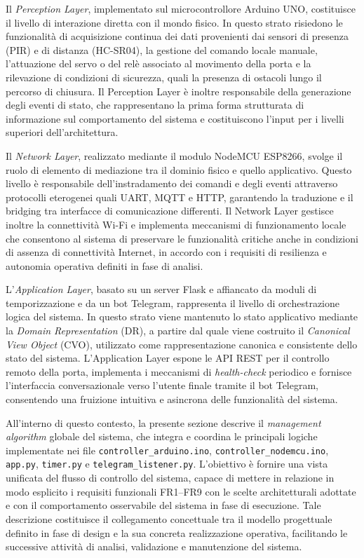 Il \textit{Perception Layer}, implementato sul microcontrollore Arduino UNO,
costituisce il livello di interazione diretta con il mondo fisico. In questo
strato risiedono le funzionalità di acquisizione continua dei dati provenienti
dai sensori di presenza (PIR) e di distanza (HC-SR04), la gestione del comando
locale manuale, l’attuazione del servo o del relè associato al movimento della
porta e la rilevazione di condizioni di sicurezza, quali la presenza di
ostacoli lungo il percorso di chiusura. Il Perception Layer è inoltre
responsabile della generazione degli eventi di stato, che rappresentano la
prima forma strutturata di informazione sul comportamento del sistema e
costituiscono l’input per i livelli superiori dell’architettura.

Il \textit{Network Layer}, realizzato mediante il modulo NodeMCU ESP8266,
svolge il ruolo di elemento di mediazione tra il dominio fisico e quello
applicativo. Questo livello è responsabile dell’instradamento dei comandi e
degli eventi attraverso protocolli eterogenei quali UART, MQTT e HTTP,
garantendo la traduzione e il bridging tra interfacce di comunicazione
differenti. Il Network Layer gestisce inoltre la connettività Wi-Fi e implementa
meccanismi di funzionamento locale che consentono al sistema di preservare le
funzionalità critiche anche in condizioni di assenza di connettività Internet,
in accordo con i requisiti di resilienza e autonomia operativa definiti in fase
di analisi.

L’\textit{Application Layer}, basato su un server Flask e affiancato da moduli
di temporizzazione e da un bot Telegram, rappresenta il livello di
orchestrazione logica del sistema. In questo strato viene mantenuto lo stato
applicativo mediante la \textit{Domain Representation} (DR), a partire dal quale
viene costruito il \textit{Canonical View Object} (CVO), utilizzato come
rappresentazione canonica e consistente dello stato del sistema. L’Application
Layer espone le API REST per il controllo remoto della porta, implementa i
meccanismi di \textit{health-check} periodico e fornisce l’interfaccia
conversazionale verso l’utente finale tramite il bot Telegram, consentendo una
fruizione intuitiva e asincrona delle funzionalità del sistema.

All’interno di questo contesto, la presente sezione descrive il
\textit{management algorithm} globale del sistema, che integra e coordina le
principali logiche implementate nei file
\texttt{controller\_arduino.ino}, \texttt{controller\_nodemcu.ino},
\texttt{app.py}, \texttt{timer.py} e \texttt{telegram\_listener.py}. L’obiettivo
è fornire una vista unificata del flusso di controllo del sistema, capace di
mettere in relazione in modo esplicito i requisiti funzionali FR1--FR9 con le
scelte architetturali adottate e con il comportamento osservabile del sistema in
fase di esecuzione. Tale descrizione costituisce il collegamento concettuale tra
il modello progettuale definito in fase di design e la sua concreta
realizzazione operativa, facilitando le successive attività di analisi,
validazione e manutenzione del sistema.


